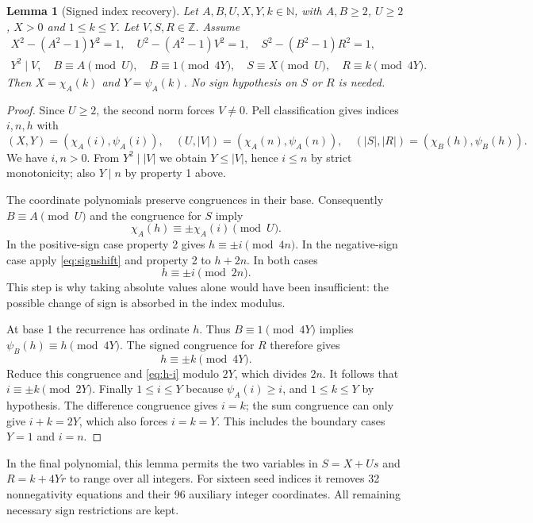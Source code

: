 \documentclass[11pt]{article}
\newtheorem{lemma}[theorem]{Lemma}
\theoremstyle{definition}
\theoremstyle{remark}
\newcommand{\NN}{\mathbb N}
\newcommand{\ZZ}{\mathbb Z}
\begin{document}
\begin{lemma}[Signed index recovery]\label{lem:signed}
Let $A,B,U,X,Y,k\in\NN$, with $A,B\ge2$, $U\ge2$, $X>0$ and $1\le k\le Y$.
Let $V,S,R\in\ZZ$. Assume
\begin{gather}
 X^2-(A^2-1)Y^2=1,\quad U^2-(A^2-1)V^2=1,
 \quad S^2-(B^2-1)R^2=1,\label{eq:three-norms}\\
 Y^2\mid V,\quad B\equiv A\pmod U,\quad B\equiv1\pmod{4Y},
 \quad S\equiv X\pmod U,\quad R\equiv k\pmod{4Y}.\label{eq:signed-cong}
\end{gather}
Then $X=\chi_A(k)$ and $Y=\psi_A(k)$. No sign hypothesis on $S$ or $R$
is needed.
\end{lemma}

\begin{proof}
Since $U\ge2$, the second norm forces $V\ne0$. Pell classification gives
indices $i,n,h$ with
\[
 (X,Y)=(\chi_A(i),\psi_A(i)),\quad
 (U,|V|)=(\chi_A(n),\psi_A(n)),\quad
 (|S|,|R|)=(\chi_B(h),\psi_B(h)).
\]
We have $i,n>0$. From $Y^2\mid|V|$ we obtain $Y\le|V|$, hence $i\le n$
by strict monotonicity; also $Y\mid n$ by property 1 above.

The coordinate polynomials preserve congruences in their base. Consequently
$B\equiv A\pmod U$ and the congruence for $S$ imply
\[
 \chi_A(h)\equiv \pm\chi_A(i)\pmod U.
\]
In the positive-sign case property 2 gives $h\equiv\pm i\pmod{4n}$.
In the negative-sign case apply \eqref{eq:signshift} and property 2 to
$h+2n$. In both cases
\begin{equation}\label{eq:h-i}
 h\equiv\pm i\pmod{2n}.
\end{equation}
This step is why taking absolute values alone would have been insufficient:
the possible change of sign is absorbed in the index modulus.

At base 1 the recurrence has ordinate $h$. Thus
$B\equiv1\pmod{4Y}$ implies $\psi_B(h)\equiv h\pmod{4Y}$.
The signed congruence for $R$ therefore gives
\[
 h\equiv\pm k\pmod{4Y}.
\]
Reduce this congruence and \eqref{eq:h-i} modulo $2Y$, which divides
$2n$. It follows that $i\equiv\pm k\pmod{2Y}$.
Finally $1\le i\le Y$ because $\psi_A(i)\ge i$, and $1\le k\le Y$
by hypothesis. The difference congruence gives $i=k$; the sum congruence
can only give $i+k=2Y$, which also forces $i=k=Y$.
This includes the boundary cases $Y=1$ and $i=n$.
\end{proof}

In the final polynomial, this lemma permits the two variables in
$S=X+Us$ and $R=k+4Yr$ to range over all integers. For sixteen seed
indices it removes 32 nonnegativity equations and their 96 auxiliary
integer coordinates. All remaining necessary sign restrictions are kept.
\end{document}
